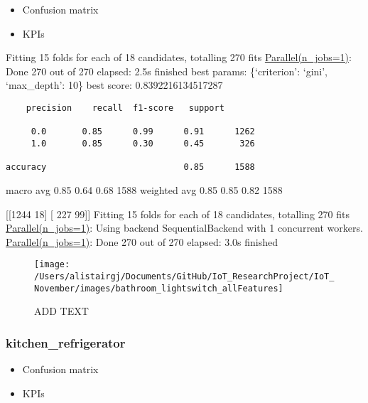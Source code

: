 \documentclass[11pt,]{article}
\providecommand{\tightlist}{%
  \setlength{\itemsep}{0pt}\setlength{\parskip}{0pt}}
\begin{document}
\begin{itemize}
\tightlist
\item
  Confusion matrix
\item
  KPIs
\end{itemize}

Fitting 15 folds for each of 18 candidates, totalling 270 fits
\href{Done\%20270\%20out\%20of\%20270\%20\%7C\%20elapsed:\%202.1s\%20finished}{Parallel(n\_jobs=1)}:
Done 270 out of 270 \textbar{} elapsed: 2.5s finished best params:
\{`criterion': `gini', `max\_depth': 10\} best score: 0.8392216134517287

\begin{verbatim}
    precision    recall  f1-score   support

     0.0       0.85      0.99      0.91      1262
     1.0       0.85      0.30      0.45       326

accuracy                           0.85      1588
\end{verbatim}

macro avg 0.85 0.64 0.68 1588 weighted avg 0.85 0.85 0.82 1588

{[}{[}1244 18{]} {[} 227 99{]}{]} Fitting 15 folds for each of 18
candidates, totalling 270 fits
\href{Done\%20270\%20out\%20of\%20270\%20\%7C\%20elapsed:\%202.1s\%20finished}{Parallel(n\_jobs=1)}:
Using backend SequentialBackend with 1 concurrent workers.
\href{Done\%20270\%20out\%20of\%20270\%20\%7C\%20elapsed:\%202.1s\%20finished}{Parallel(n\_jobs=1)}:
Done 270 out of 270 \textbar{} elapsed: 3.0s finished

\begin{figure}[H]

{\centering \texttt{[image: /Users/alistairgj/Documents/GitHub/IoT\_ResearchProject/IoT\_November/images/bathroom\_lightswitch\_allFeatures]} 

}

\caption{ADD TEXT}\label{fig:unnamed-chunk-7}
\end{figure}

\pagebreak

\hypertarget{kitchen_refrigerator}{%
\subsubsection{kitchen\_refrigerator}\label{kitchen_refrigerator}}

\begin{itemize}
\tightlist
\item
  Confusion matrix
\item
  KPIs
\end{itemize}
\end{document}
